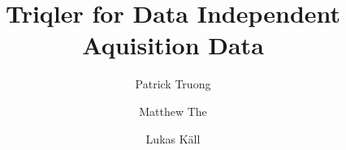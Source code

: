 \title{Triqler for Data Independent Aquisition Data}
\author{Patrick Truong \and Matthew The \and Lukas K\"{a}ll}
